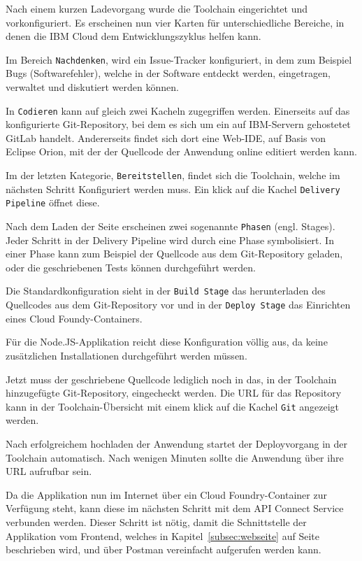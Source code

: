 Nach einem kurzen Ladevorgang wurde die Toolchain eingerichtet und vorkonfiguriert. Es erscheinen nun vier Karten für
unterschiedliche Bereiche, in denen die IBM Cloud dem Entwicklungszyklus helfen kann.

Im Bereich \texttt{Nachdenken}, wird ein Issue-Tracker konfiguriert, in dem zum Beispiel Bugs (Softwarefehler), welche
in der Software entdeckt werden, eingetragen, verwaltet und diskutiert werden können.

In \texttt{Codieren} kann auf gleich zwei Kacheln zugegriffen werden. Einerseits auf das konfigurierte Git-Repository,
bei dem es sich um ein auf IBM-Servern gehostetet GitLab handelt. Andererseits findet sich dort eine Web-IDE, auf Basis
von Eclipse Orion, mit der der Quellcode der Anwendung online editiert werden kann.

Im der letzten Kategorie, \texttt{Bereitstellen}, findet sich die Toolchain, welche im nächsten Schritt Konfiguriert werden
muss. Ein klick auf die Kachel \texttt{Delivery Pipeline} öffnet diese.

Nach dem Laden der Seite erscheinen zwei sogenannte \texttt{Phasen} (engl. Stages). Jeder Schritt in der Delivery Pipeline
wird durch eine Phase symbolisiert. In einer Phase kann zum Beispiel der Quellcode aus dem Git-Repository geladen, oder
die geschriebenen Tests können durchgeführt werden.

Die Standardkonfiguration sieht in der \texttt{Build Stage} das herunterladen des Quellcodes aus dem Git-Repository vor
und in der \texttt{Deploy Stage} das Einrichten eines Cloud Foundy-Containers.

Für die Node.JS-Applikation reicht diese Konfiguration völlig aus, da keine zusätzlichen Installationen durchgeführt
werden müssen.

Jetzt muss der geschriebene Quellcode lediglich noch in das, in der Toolchain hinzugefügte Git-Repository, eingecheckt
werden. Die URL für das Repository kann in der Toolchain-Übersicht mit einem klick auf die Kachel \texttt{Git} angezeigt
werden.

Nach erfolgreichem hochladen der Anwendung startet der Deployvorgang in der Toolchain automatisch. Nach wenigen Minuten
sollte die Anwendung über ihre URL aufrufbar sein.

Da die Applikation nun im Internet über ein Cloud Foundry-Container zur Verfügung steht, kann diese im nächsten Schritt
mit dem API Connect Service verbunden werden. Dieser Schritt ist nötig, damit die Schnittstelle der Applikation vom
Frontend, welches in Kapitel~\ref{subsec:webseite} auf Seite~\pageref{subsec:webseite} beschrieben wird, und über Postman
vereinfacht aufgerufen werden kann.


